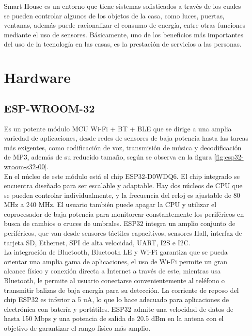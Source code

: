 Smart House es un entorno que tiene sistemas sofisticados a través de los cuales se pueden controlar algunos de los objetos de la casa, como luces, puertas, ventanas, además puede racionalizar el consumo de energía, entre otras funciones mediante el uso de sensores. Básicamente, uno de los beneficios más importantes del uso de la tecnología en las casas, es la prestación de servicios a las personas.\cite{Howedi2016} 

\section{Hardware}

\subsection{ESP-WROOM-32}

Es un potente módulo MCU Wi-Fi + BT + BLE que se dirige a una amplia variedad de aplicaciones, desde redes de sensores de baja potencia hasta las tareas más exigentes, como codificación de voz, transmisión de música y decodificación de MP3, además de su reducido tamaño, según se observa en la figura \ref{fig:esp32-wroom-s32-00}.\\

En el núcleo de este módulo está el chip ESP32-D0WDQ6. El chip integrado se encuentra diseñado para ser escalable y adaptable. Hay dos núcleos de CPU que se pueden controlar individualmente, y la frecuencia del reloj es ajustable de 80 MHz a 240 MHz. El usuario también puede apagar la CPU y utilizar el coprocesador de baja potencia para monitorear constantemente los periféricos en busca de cambios o cruces de umbrales. ESP32 integra un amplio conjunto de periféricos, que van desde sensores táctiles capacitivos, sensores Hall, interfaz de tarjeta SD, Ethernet, SPI de alta velocidad, UART, I2S e I2C.\\

La integración de Bluetooth, Bluetooth LE y Wi-Fi garantiza que se pueda orientar una amplia gama de aplicaciones, el uso de Wi-Fi permite un gran alcance físico y conexión directa a Internet a través de este, mientras usa Bluetooth, le permite al usuario conectarse convenientemente al teléfono o transmitir balizas de baja energía para su detección. La corriente de reposo del chip ESP32 es inferior a 5 uA, lo que lo hace adecuado para aplicaciones de electrónica con batería y portátiles. ESP32 admite una velocidad de datos de hasta 150 Mbps y una potencia de salida de 20.5 dBm en la antena con el objetivo de garantizar el rango físico más amplio.\\

